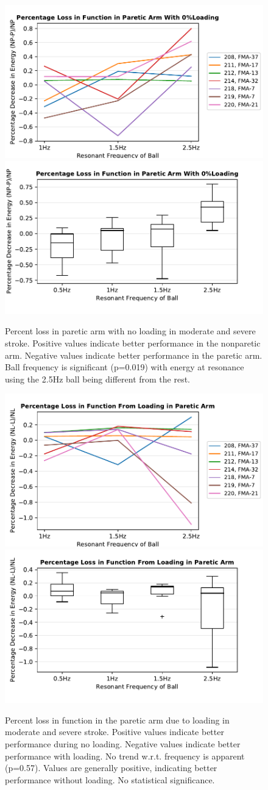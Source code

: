 \documentclass{article}
\begin{document}
\begin{figure}[!ht]
     \centering
     \includegraphics[width=0.49\linewidth]{Plots/pl_SL0_indiv_ms.pdf}
     \includegraphics[width=0.49\linewidth]{Plots/pl_SL0_ms.pdf}
	\caption{Percent loss in paretic arm with no loading in moderate and severe stroke. Positive values indicate better performance in the nonparetic arm. Negative values indicate better performance in the paretic arm. Ball frequency is significant (p=0.019) with energy at resonance using the 2.5Hz ball being different from the rest.}
\end{figure}


\begin{figure}[!ht]
     \centering
     \includegraphics[width=0.49\linewidth]{Plots/pl_A0_indiv_ms.pdf}
     \includegraphics[width=0.49\linewidth]{Plots/pl_A0_ms.pdf}
	\caption{Percent loss in function in the paretic arm due to loading in moderate and severe stroke. Positive values indicate better performance during no loading. Negative values indicate better performance with loading. No trend w.r.t. frequency is apparent (p=0.57). Values are generally positive, indicating better performance without loading. No statistical significance.}
\end{figure}
\end{document}
